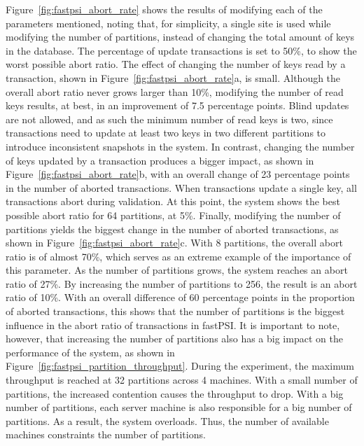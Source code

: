 Figure~\ref{fig:fastpsi_abort_rate} shows the results of modifying each of the parameters mentioned, noting that, for simplicity, a single site is used while modifying the number of partitions, instead of changing the total amount of keys in the database. The percentage of update transactions is set to 50\%, to show the worst possible abort ratio. The effect of changing the number of keys read by a transaction, shown in Figure~\ref{fig:fastpsi_abort_rate}a, is small. Although the overall abort ratio never grows larger than 10\%, modifying the number of read keys results, at best, in an improvement of 7.5 percentage points. Blind updates are not allowed, and as such the minimum number of read keys is two, since transactions need to update at least two keys in two different partitions to introduce inconsistent snapshots in the system. In contrast, changing the number of keys updated by a transaction produces a bigger impact, as shown in Figure~\ref{fig:fastpsi_abort_rate}b, with an overall change of 23 percentage points in the number of aborted transactions. When transactions update a single key, all transactions abort during validation. At this point, the system shows the best possible abort ratio for 64 partitions, at 5\%. Finally, modifying the number of partitions yields the biggest change in the number of aborted transactions, as shown in Figure~\ref{fig:fastpsi_abort_rate}c. With 8 partitions, the overall abort ratio is of almost 70\%, which serves as an extreme example of the importance of this parameter. As the number of partitions grows, the system reaches an abort ratio of 27\%. By increasing the number of partitions to 256, the result is an abort ratio of 10\%. With an overall difference of 60 percentage points in the proportion of aborted transactions, this shows that the number of partitions is the biggest influence in the abort ratio of transactions in fastPSI. It is important to note, however, that increasing the number of partitions also has a big impact on the performance of the system, as shown in Figure~\ref{fig:fastpsi_partition_throughput}. During the experiment, the maximum throughput is reached at 32 partitions across 4 machines. With a small number of partitions, the increased contention causes the throughput to drop. With a big number of partitions, each server machine is also responsible for a big number of partitions. As a result, the system overloads. Thus, the number of available machines constraints the number of partitions.

